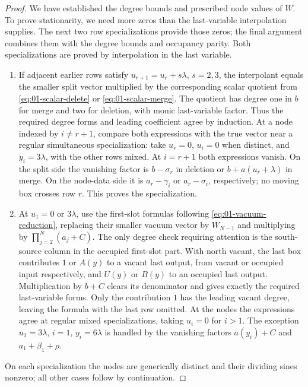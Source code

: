 \begin{proof}
We have established the degree bounds and prescribed node values of
$W$. To prove stationarity, we need more zeros than the last-variable
interpolation supplies. The next two row specializations provide those
zeros; the final argument combines them with the degree bounds and
occupancy parity. Both specializations are proved by interpolation in
the last variable.
\begin{enumerate}
\item If adjacent earlier rows satisfy $u_{r+1}=u_r+s\lambda$,
$s=2,3$, the interpolant equals the smaller split vector multiplied
by the corresponding scalar quotient from
\eqref{eq:01-scalar-delete} or \eqref{eq:01-scalar-merge}.
The quotient has degree one in $b$ for merge and two for deletion,
with monic last-variable factor. Thus the required degree forms and leading
coefficient agree by induction. At a node indexed by $i\ne r+1$,
compare both expressions with the true vector near a regular
simultaneous specialization: take $u_r=0$, $u_i=0$ when distinct,
and $y_i=3\lambda$, with the other rows mixed. At $i=r+1$ both
expressions vanish. On the split side the vanishing factor is
$b-\sigma_r$ in deletion or $b+a(u_r+\lambda)$ in merge. On the
node-data side it is $a_r-\gamma_i$ or $a_r-\sigma_i$, respectively;
no moving box crosses row $r$. This proves the specialization.
\item At $u_1=0$ or $3\lambda$, use the first-slot formulas following
\eqref{eq:01-vacuum-reduction}, replacing their smaller vacuum vector
by $W_{N-1}$ and multiplying by $\prod_{j=2}^N(a_j+C)$.
The only degree check requiring attention is the south-source column
in the occupied first-slot part. With north vacant, the last box
contributes $1$ or $A(y)$ to a vacant last output, from vacant or
occupied input respectively, and $U(y)$ or $B(y)$ to an occupied
last output. Multiplication by $b+C$ clears its denominator and gives
exactly the required last-variable forms. Only the contribution $1$
has the leading vacant degree, leaving the formula with the last row
omitted. At the nodes the expressions agree at regular mixed
specializations, taking $u_i=0$ for $i>1$. The exception
$u_1=3\lambda$, $i=1$, $y_i=6\lambda$ is handled by the vanishing
factors $a(y_i)+C$ and $a_1+\beta_1+\rho$.
\end{enumerate}
On each specialization the nodes are generically distinct and their
dividing sines nonzero; all other cases follow by continuation.


\end{proof}
